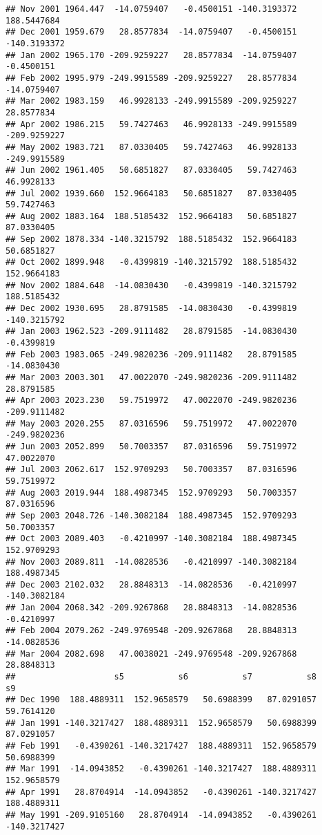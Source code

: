 \documentclass[]{article}
\begin{document}
\begin{verbatim}
## Nov 2001 1964.447  -14.0759407   -0.4500151 -140.3193372  188.5447684
## Dec 2001 1959.679   28.8577834  -14.0759407   -0.4500151 -140.3193372
## Jan 2002 1965.170 -209.9259227   28.8577834  -14.0759407   -0.4500151
## Feb 2002 1995.979 -249.9915589 -209.9259227   28.8577834  -14.0759407
## Mar 2002 1983.159   46.9928133 -249.9915589 -209.9259227   28.8577834
## Apr 2002 1986.215   59.7427463   46.9928133 -249.9915589 -209.9259227
## May 2002 1983.721   87.0330405   59.7427463   46.9928133 -249.9915589
## Jun 2002 1961.405   50.6851827   87.0330405   59.7427463   46.9928133
## Jul 2002 1939.660  152.9664183   50.6851827   87.0330405   59.7427463
## Aug 2002 1883.164  188.5185432  152.9664183   50.6851827   87.0330405
## Sep 2002 1878.334 -140.3215792  188.5185432  152.9664183   50.6851827
## Oct 2002 1899.948   -0.4399819 -140.3215792  188.5185432  152.9664183
## Nov 2002 1884.648  -14.0830430   -0.4399819 -140.3215792  188.5185432
## Dec 2002 1930.695   28.8791585  -14.0830430   -0.4399819 -140.3215792
## Jan 2003 1962.523 -209.9111482   28.8791585  -14.0830430   -0.4399819
## Feb 2003 1983.065 -249.9820236 -209.9111482   28.8791585  -14.0830430
## Mar 2003 2003.301   47.0022070 -249.9820236 -209.9111482   28.8791585
## Apr 2003 2023.230   59.7519972   47.0022070 -249.9820236 -209.9111482
## May 2003 2020.255   87.0316596   59.7519972   47.0022070 -249.9820236
## Jun 2003 2052.899   50.7003357   87.0316596   59.7519972   47.0022070
## Jul 2003 2062.617  152.9709293   50.7003357   87.0316596   59.7519972
## Aug 2003 2019.944  188.4987345  152.9709293   50.7003357   87.0316596
## Sep 2003 2048.726 -140.3082184  188.4987345  152.9709293   50.7003357
## Oct 2003 2089.403   -0.4210997 -140.3082184  188.4987345  152.9709293
## Nov 2003 2089.811  -14.0828536   -0.4210997 -140.3082184  188.4987345
## Dec 2003 2102.032   28.8848313  -14.0828536   -0.4210997 -140.3082184
## Jan 2004 2068.342 -209.9267868   28.8848313  -14.0828536   -0.4210997
## Feb 2004 2079.262 -249.9769548 -209.9267868   28.8848313  -14.0828536
## Mar 2004 2082.698   47.0038021 -249.9769548 -209.9267868   28.8848313
##                    s5           s6           s7           s8           s9
## Dec 1990  188.4889311  152.9658579   50.6988399   87.0291057   59.7614120
## Jan 1991 -140.3217427  188.4889311  152.9658579   50.6988399   87.0291057
## Feb 1991   -0.4390261 -140.3217427  188.4889311  152.9658579   50.6988399
## Mar 1991  -14.0943852   -0.4390261 -140.3217427  188.4889311  152.9658579
## Apr 1991   28.8704914  -14.0943852   -0.4390261 -140.3217427  188.4889311
## May 1991 -209.9105160   28.8704914  -14.0943852   -0.4390261 -140.3217427

\end{verbatim}
\end{document}

